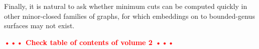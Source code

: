 \documentclass[natbib]{svcyclop}
\def\NOTE#1{\textcolor{Red}{\textbf{\textsf{••• #1 •••}}}}
\begin{document}
Finally, it is natural to ask whether minimum cuts can be computed quickly in other minor-closed families of graphs, for which embeddings on to bounded-genus surfaces may not exist.



\CrossRef

\NOTE{Check table of contents of volume 2}


\nocite{bk-amfdp-09, hkrs-fspap-97, k-msspp-05, r-mstcp-83, insw-iamcmf-11, multishort, parshort, splitting, gohog, optcycles, surflow, surfcut, homcover, global, e-dgteg-03, c-scgsp-10, p-deeoc-13}


%

\end{document}
